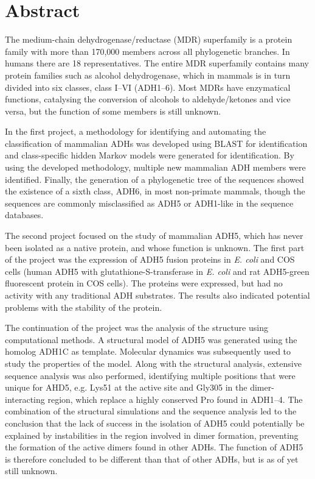 \documentclass[a4paper, 12pt]{report}
\begin{document}
\thispagestyle{empty}

\restoregeometry

\chapter*{Abstract}

The medium-chain dehydrogenase/reductase (MDR) superfamily is a protein family with more than 170,000 members across all phylogenetic branches. In humans there are 18 representatives. The entire MDR superfamily contains many protein families such as alcohol dehydrogenase, which in mammals is in turn divided into six classes, class I--VI (ADH1--6). Most MDRs have enzymatical functions, catalysing the conversion of alcohols to aldehyde/ketones and vice versa, but the function of some members is still unknown.

In the first project, a methodology for identifying and automating the classification of mammalian ADHs was developed using BLAST for identification and class-specific hidden Markov models were generated for identification.  By using the developed methodology, multiple new mammalian ADH members were identified. Finally, the generation of a phylogenetic tree of the sequences showed the existence of a sixth class, ADH6, in most non-primate mammals, though the sequences are commonly misclassified as ADH5 or ADH1-like in the sequence databases.

The second project focused on the study of mammalian ADH5, which has never been isolated as a native protein, and whose function is unknown. The first part of the project was the expression of ADH5 fusion proteins in {\em E. coli} and COS cells (human ADH5 with glutathione-S-transferase in {\em E. coli} and rat ADH5-green fluorescent protein in COS cells). The proteins were expressed, but had no activity with any traditional ADH substrates. The results also indicated potential problems with the stability of the protein.

The continuation of the project was the analysis of the structure using computational methods. A structural model of ADH5 was generated using the homolog ADH1C as template. Molecular dynamics was subsequently used to study the properties of the model. Along with the structural analysis, extensive sequence analysis was also performed, identifying multiple positions that were unique for AHD5, e.g. Lys51 at the active site and Gly305 in the dimer-interacting region, which replace a highly conserved Pro found in ADH1--4. The combination of the structural simulations and the sequence analysis led to the conclusion that the lack of success in the isolation of ADH5 could potentially be explained by instabilities in the region involved in dimer formation, preventing the formation of the active dimers found in other ADHs. The function of ADH5 is therefore concluded to be different than that of other ADHs, but is as of yet still unknown.
\end{document}
